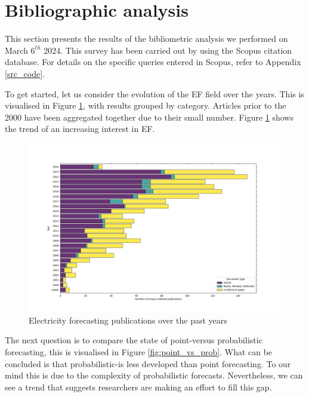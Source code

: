 \section{Bibliographic analysis}
This section presents the results of the bibliometric analysis we performed on March $6^{th}$ 2024. This survey has been carried out by using the Scopus citation database. For details on the specific queries entered in Scopus, refer to Appendix \ref{src_code}.

To get started, let us consider the evolution of the EF field over the years. This is visualised in Figure \ref{fig:epf_evolution}, with results grouped by category. Articles prior to the 2000 have been aggregated together due to their small number. Figure \ref{fig:epf_evolution} shows the trend of an increasing interest in EF.
\begin{figure}
    \includegraphics[width=\textwidth]{images/epf_evolution1.jpg}
    \caption{Electricity forecasting publications over the past years}
    \label{fig:epf_evolution}
  \end{figure}

The next question is to compare the state of point-versus probabilistic forecasting, this is visualised in Figure \ref{fig:point_vs_prob}. What can be concluded is that probabilistic-is less developed than point forecasting. To our mind this is due to the complexity of probabilistic forecasts.
Nevertheless, we can see a trend that suggests researchers are making an effort to fill this gap.


